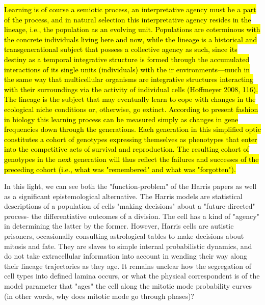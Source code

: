 \documentclass{ut-thesis}
\begin{document}
\begin{longquote}
\hl{Learning is of course a semiotic 
process, an interpretative agency must be a part of the process, and in natural selection this interpretative agency resides in the 
lineage, i.e., the population as an evolving unit.
Populations are coterminous with the concrete individuals living here and now, while the lineage
 is a historical and transgenerational subject that possess a collective agency as such, since its destiny as 
a temporal integrative structure is formed through the accumulated interactions of its single units (individuals) with the
ir environments—much in the same way that multicellular organisms are integrative structures interacting with their surroundings 
via the activity of individual cells (Hoffmeyer 2008, 116). 
The lineage is the subject that may eventually learn to cope with changes in the ecological niche conditions or, 
otherwise, go extinct. According to present fashion in biology this learning process 
can be measured simply as changes in gene frequencies down through the 
generations. Each generation in this simplified optic 
constitutes a cohort of genotypes expressing themselves as phenotypes that enter into the competitive acts of survival 
and reproduction. The resulting cohort of genotypes in the next generation will thus 
reflect the failures and successes of the preceding cohort (i.e., what was 
"remembered" and what was "forgotten").}\end{longquote}

\bigskip

In this light, we can see both the "function-problem" of the Harris papers as well as a significant epistemological alternative. The Harris models are statistical descriptions of a population of cells "making decisions" about a "future-directed" process- the differentiative outcomes of a division. The cell has a kind of "agency" in determining the latter by the former. However, Harris cells are autistic prisoners, occasionally consulting astrological tables to make decisions about mitosis and fate. They are slaves to simple internal probabilistic dynamics, and do not take extracellular information into account in wending their way along their lineage trajectories as they age. It remains unclear how the segregation of cell types into defined lamina occurs, or what the physical correspondent is of the model parameter that "ages" the cell along the mitotic mode probability curves (in other words, why does mitotic mode go through phases)?
\end{document}
